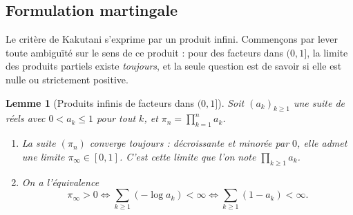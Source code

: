 \documentclass[11pt,a4paper]{article}
\theoremstyle{plain}
\newtheorem{lemma}[theorem]{Lemme}
\theoremstyle{definition}
\theoremstyle{remark}
\begin{document}
\subsection{Formulation martingale}

Le critère de Kakutani s'exprime par un produit infini. Commençons par lever
toute ambiguïté sur le sens de ce produit : pour des facteurs dans $(0,1]$, la
limite des produits partiels existe \emph{toujours}, et la seule question est
de savoir si elle est nulle ou strictement positive.

\begin{lemma}[{Produits infinis de facteurs dans $(0,1]$}]\label{lem:prod-inf}
Soit $(a_k)_{k\ge1}$ une suite de réels avec $0 < a_k \le 1$ pour tout $k$, et
$\pi_n = \prod_{k=1}^{n} a_k$.
\begin{enumerate}[label=(\roman*)]
\item La suite $(\pi_n)$ converge toujours : décroissante et minorée par $0$,
      elle admet une limite $\pi_\infty \in [0,1]$. C'est cette limite que
      l'on note $\prod_{k\ge1} a_k$.
\item On a l'équivalence
\[
\pi_\infty > 0
\iff \sum_{k\ge1} (-\log a_k) < \infty
\iff \sum_{k\ge1} (1 - a_k) < \infty.
\]
\end{enumerate}
\end{lemma}
\end{document}
